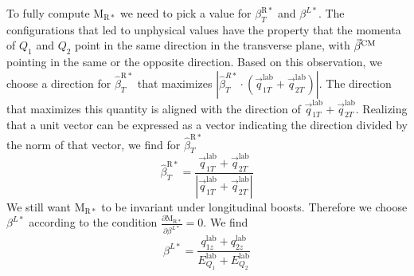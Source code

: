 To fully compute $\mathrm{M_{R*}}$ we need to pick a value for $\beta_T^{\mathrm{R}*}$ and
$\beta^{L*}$. The configurations that led to unphysical \mr values have the property that the
momenta of $Q_1$ and $Q_2$ point in the same direction in the transverse plane, with $\vec{\beta}^{\textrm{CM}}$
pointing in the same or the opposite direction. Based on this observation, we choose a direction
for $\hat{\beta}_T^{\mathrm{R}*}$ that maximizes $|\hat{\beta}_T^{R*} \cdot
(\vec{q}_{1T}^{\textrm{lab}} + \vec{q}_{2T}^{\textrm{lab}})|$. The direction that maximizes this
quantity is aligned with the direction of $\vec{q}_{1T}^{\textrm{lab}} +
\vec{q}_{2T}^{\textrm{lab}}$. Realizing that a unit vector can be expressed as a vector indicating
the direction divided by the norm of that vector, we find for $\hat{\beta}_T^{\mathrm{R}*}$ 
\begin{equation}
  \hat{\beta}_T^{\mathrm{R}*} = \frac{\vec{q}_{1T}^{\textrm{lab}} +
\vec{q}_{2T}^{\textrm{lab}}}{|\vec{q}_{1T}^{\textrm{lab}} + \vec{q}_{2T}^{\textrm{lab}}|}
\label{eq:razor_beta_T_Rstar}
\end{equation}
We still want $\mathrm{M_{R*}}$ to be invariant under longitudinal boosts. Therefore we choose
$\beta^{L*}$ according to the condition $\frac{\partial \mathrm{M_{R*}}}{\partial \beta^{L*}} = 0$.
We find
\begin{equation}
  \beta^{L*} = \frac{q_{1z}^{\textrm{lab}} + q_{2z}^{\textrm{lab}}}
{E_{Q_1}^{\textrm{lab}} + E_{Q_2}^{\textrm{lab}}}
\label{eq:razor_beta_Lstar}
\end{equation}

